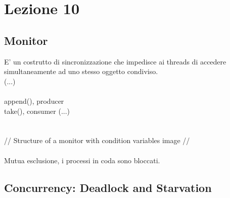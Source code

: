 \documentclass[12pt, a4paper]{article}
\begin{document}
	\section*{Lezione 10}

	\subsection*{Monitor}
	
	E' un costrutto di sincronizzazione che impedisce ai threads di accedere simultaneamente ad uno stesso oggetto condiviso. \\
	(...) \\
	\\ append(), producer \\
	take(), consumer (...) \\ \\ \\
	
	// Structure of a monitor with condition variables image // \\ \\
	
	Mutua esclusione, i processi in coda sono bloccati.
	
	\subsection*{Concurrency: Deadlock and Starvation}
	
\end{document}
